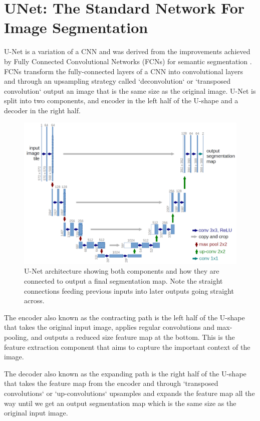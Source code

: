\section{UNet: The Standard Network For Image Segmentation}
U-Net \cite{UNet} is a variation of a CNN and was derived from the improvements achieved by Fully Connected Convolutional Networks (FCNs) for semantic segmentation \cite{FCN}. FCNs transform the fully-connected layers of a CNN into convolutional layers and through an upsampling strategy called `deconvolution` or `transposed convolution` output an image that is the same size as the original image. U-Net is split into two components, and encoder in the left half of the U-shape and a decoder in the right half. 

\begin{figure}[H] \centering
    \includegraphics[width=\linewidth]{figures/unet_architecture.png}
    \caption{U-Net architecture showing both components and how they are connected to output a final segmentation map. Note the straight connections feeding previous inputs into later outputs going straight across.}
\end{figure}

The encoder also known as the contracting path is the left half of the U-shape that takes the original input image, applies regular convolutions and max-pooling, and outputs a reduced size feature map at the bottom. This is the feature extraction component that aims to capture the important context of the image.

The decoder also known as the expanding path is the right half of the U-shape that takes the feature map from the encoder and through `transposed convolutions` or `up-convolutions` upsamples and expands the feature map all the way until we get an output segmentation map which is the same size as the original input image.

